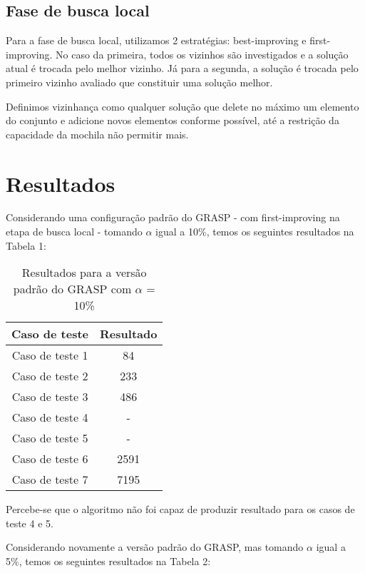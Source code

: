 \documentclass{article}
\begin{document}
\subsection{Fase de busca local}

Para a fase de busca local, utilizamos 2 estratégias: best-improving e first-improving. No caso da primeira, todos os vizinhos são investigados e a solução atual é trocada pelo melhor vizinho. Já para a segunda, a solução é trocada pelo primeiro vizinho avaliado que constituir uma solução melhor.

Definimos vizinhança como qualquer solução que delete no máximo um elemento do conjunto e adicione novos elementos conforme possível, até a restrição da capacidade da mochila não permitir mais.

\section{Resultados}

Considerando uma configuração padrão do GRASP - com first-improving na etapa de busca local - tomando $\alpha$ igual a 10\%, temos os seguintes resultados na Tabela 1:

\begin{table}[htbp]
\centering
\begin{tabular}{|c|c|}
\hline
\textbf{Caso de teste} & \textbf{Resultado} \\
\hline
Caso de teste 1 & 84 \\
Caso de teste 2 & 233 \\
Caso de teste 3 & 486\\
Caso de teste 4 &  - \\
Caso de teste 5 &  - \\
Caso de teste 6 & 2591 \\
Caso de teste 7 & 7195 \\

\hline
\end{tabular}
\caption{Resultados para a versão padrão do GRASP com $\alpha$ = 10\%}
\label{tab:minha_tabela}
\end{table}

Percebe-se que o algoritmo não foi capaz de produzir resultado para os casos de teste 4 e 5.

Considerando novamente a versão padrão do GRASP, mas tomando $\alpha$ igual a 5\%, temos os seguintes resultados na Tabela 2:
\end{document}
